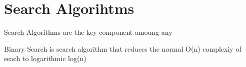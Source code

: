 \chapter{Search Algorihtms}

Search Algorithms are the key component amoung any 

Binary Search is search algorithm that reduces the normal O(n) complexiy of seach to logarithmic log(n)

